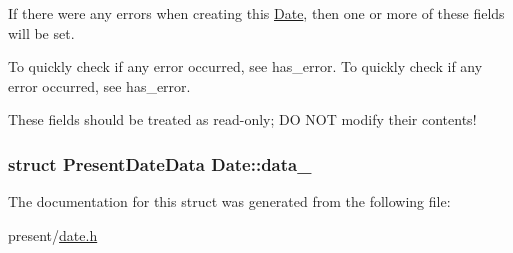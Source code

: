 If there were any errors when creating this \hyperlink{structDate}{Date}, then one or more of these fields will be set. 

To quickly check if any error occurred, see {\ttfamily has\-\_\-error}. To quickly check if any error occurred, see {\ttfamily has\-\_\-error}.

These fields should be treated as read-\/only; D\-O N\-O\-T modify their contents! \hypertarget{structDate_a15a7ce699435bf3c9c60bfff5e1806de}{
\subsubsection[{data\-\_\-}]{\setlength{\rightskip}{0pt plus 5cm}struct Present\-Date\-Data Date\-::data\-\_\-}}\label{structDate_a15a7ce699435bf3c9c60bfff5e1806de}


The documentation for this struct was generated from the following file\-:\begin{DoxyCompactItemize}
\item 
present/\hyperlink{date_8h}{date.\-h}\end{DoxyCompactItemize}
